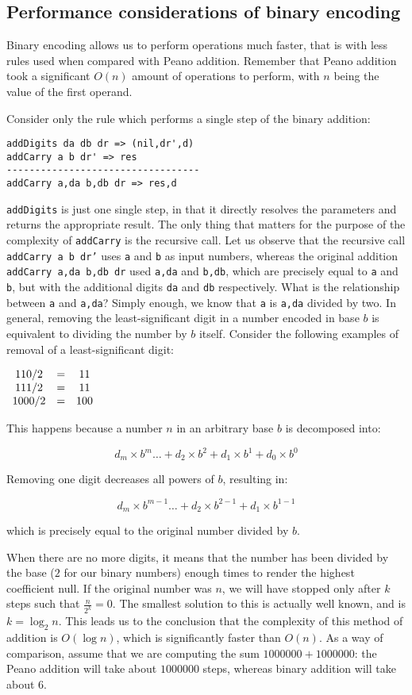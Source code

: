 \subsection{Performance considerations of binary encoding}
Binary encoding allows us to perform operations much faster, that is with less rules used when compared with Peano addition. Remember that Peano addition took a significant $O(n)$ amount of operations to perform, with $n$ being the value of the first operand.

Consider only the rule which performs a single step of the binary addition:

\begin{lstlisting}
addDigits da db dr => (nil,dr',d)
addCarry a b dr' => res
----------------------------------
addCarry a,da b,db dr => res,d
\end{lstlisting}

\texttt{addDigits} is just one single step, in that it directly resolves the parameters and returns the appropriate result. The only thing that matters for the purpose of the complexity of \texttt{addCarry} is the recursive call. Let us observe that the recursive call \texttt{addCarry a b dr'} uses \texttt{a} and \texttt{b} as input numbers, whereas the original addition \texttt{addCarry a,da b,db dr} used \texttt{a,da} and \texttt{b,db}, which are precisely equal to \texttt{a} and \texttt{b}, but with the additional digits \texttt{da} and \texttt{db} respectively. What is the relationship between \texttt{a} and \texttt{a,da}? Simply enough, we know that \texttt{a} is \texttt{a,da} divided by two. In general, removing the least-significant digit in a number encoded in base $b$ is equivalent to dividing the number by $b$ itself. Consider the following examples of removal of a least-significant digit:

$\begin{array}{c c c}
  110 / 2 & = & 11 \\
  111 / 2 & = & 11 \\
  1000 / 2 & = & 100
\end{array}$

This happens because a number $n$ in an arbitrary base $b$ is decomposed into:

$$d_m \times b^m \dots + d_2 \times b^2 + d_1 \times b^1 + d_0 \times b^0$$

Removing one digit decreases all powers of $b$, resulting in:

$$d_m \times b^{m-1} \dots + d_2 \times b^{2-1} + d_1 \times b^{1-1}$$

which is precisely equal to the original number divided by $b$.


When there are no more digits, it means that the number has been divided by the base ($2$ for our binary numbers) enough times to render the highest coefficient null. If the original number was $n$, we will have stopped only after $k$ steps such that $\frac{n}{2^k} = 0$. The smallest solution to this is actually well known, and is $k = \log_2 n$. This leads us to the conclusion that the complexity of this method of addition is $O(\log n)$, which is significantly faster than $O(n)$. As a way of comparison, assume that we are computing the sum $1000000 + 1000000$: the Peano addition will take about $1000000$ steps, whereas binary addition will take about $6$.
